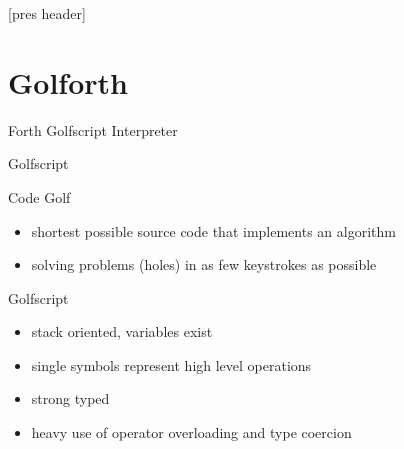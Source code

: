 \documentclass{beamer}
\newcommand{\zwischenueberschrift}[1] { 
    \Huge{#1}
}
\begin{document}
[pres header]



%
%






\section{Golforth}

\begin{frame}
\begin{center}
\zwischenueberschrift{Forth Golfscript Interpreter}
\end{center}
\end{frame}


\begin{frame}
\begin{center}
\zwischenueberschrift{Golfscript}
\end{center}
\end{frame}


\begin{frame}
    
    \vspace{0.5cm}

    Code Golf 
    \begin{itemize}
    \item shortest possible source code that implements an algorithm  
    \item solving problems (holes) in as few keystrokes as possible
    \end{itemize}

    \vspace{0.5cm}
    \pause 

    Golfscript
    \begin{itemize}
        \item stack oriented, variables exist
        \item single symbols represent high level operations  
        \item strong typed
        \item heavy use of operator overloading and type coercion
    \end{itemize}
\end{frame}
\end{document}
